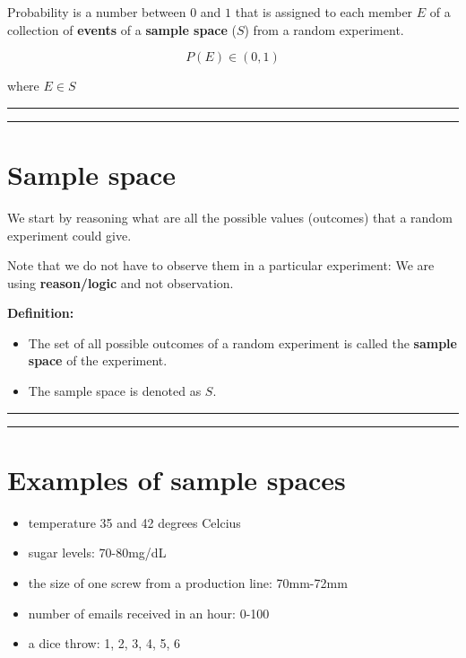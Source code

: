 \documentclass[
]{book}
\providecommand{\tightlist}{%
  \setlength{\itemsep}{0pt}\setlength{\parskip}{0pt}}
\begin{document}
Probability is a number between \(0\) and \(1\) that is assigned to each member \(E\) of a collection of \textbf{events} of a \textbf{sample space} (\(S\)) from a random experiment.

\[P(E) \in (0,1)\]

where \(E \in S\)

\begin{center}\rule{0.5\linewidth}{0.5pt}\end{center}

\begin{center}\rule{0.5\linewidth}{0.5pt}\end{center}

\hypertarget{sample-space}{%
\section{Sample space}\label{sample-space}}

We start by reasoning what are all the possible values (outcomes) that a random experiment could give.

Note that we do not have to observe them in a particular experiment: We are using \textbf{reason/logic} and not observation.

\textbf{Definition:}

\begin{itemize}
\item
  The set of all possible outcomes of a random experiment is called the \textbf{sample space}
  of the experiment.
\item
  The sample space is denoted as \(S\).
\end{itemize}

\begin{center}\rule{0.5\linewidth}{0.5pt}\end{center}

\begin{center}\rule{0.5\linewidth}{0.5pt}\end{center}

\hypertarget{examples-of-sample-spaces}{%
\section{Examples of sample spaces}\label{examples-of-sample-spaces}}

\begin{itemize}
\tightlist
\item
  temperature 35 and 42 degrees Celcius
\item
  sugar levels: 70-80mg/dL
\item
  the size of one screw from a production line: 70mm-72mm
\item
  number of emails received in an hour: 0-100
\item
  a dice throw: 1, 2, 3, 4, 5, 6
\end{itemize}
\end{document}
